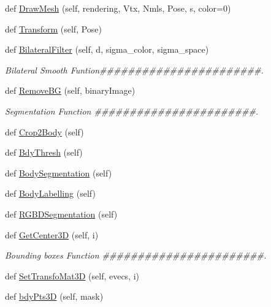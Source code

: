 \begin{DoxyCompactItemize}
\item 
def \hyperlink{class_r_g_b_d_1_1_r_g_b_d_a64b91c854c9de20090ad961f201fe026}{Draw\+Mesh} (self, rendering, Vtx, Nmls, Pose, s, color=0)
\item 
def \hyperlink{class_r_g_b_d_1_1_r_g_b_d_a0ca12b764dab40af78e8a83a5b9f3011}{Transform} (self, Pose)
\item 
def \hyperlink{class_r_g_b_d_1_1_r_g_b_d_a8009d6498ed9607e5fb86d8085244d4f}{Bilateral\+Filter} (self, d, sigma\+\_\+color, sigma\+\_\+space)
\begin{DoxyCompactList}\small\item\em Bilateral Smooth Funtion\#\#\#\#\#\#\#\#\#\#\#\#\#\#\#\#\#\#\#\#\#\#\#. \end{DoxyCompactList}\item 
def \hyperlink{class_r_g_b_d_1_1_r_g_b_d_ad9260800129b014cc2b56acfe0f1bd0e}{Remove\+BG} (self, binary\+Image)
\begin{DoxyCompactList}\small\item\em Segmentation Function \#\#\#\#\#\#\#\#\#\#\#\#\#\#\#\#\#\#\#\#\#\#\#. \end{DoxyCompactList}\item 
def \hyperlink{class_r_g_b_d_1_1_r_g_b_d_a9581af6ebd3185db5b84b0851c7b431e}{Crop2\+Body} (self)
\item 
def \hyperlink{class_r_g_b_d_1_1_r_g_b_d_ad9c546e3a447805ff908cbc072efe6e5}{Bdy\+Thresh} (self)
\item 
def \hyperlink{class_r_g_b_d_1_1_r_g_b_d_aeed6372b3733ba2f4291f2cf187c7455}{Body\+Segmentation} (self)
\item 
def \hyperlink{class_r_g_b_d_1_1_r_g_b_d_a752dd9b82235dce29c270462a8c38556}{Body\+Labelling} (self)
\item 
def \hyperlink{class_r_g_b_d_1_1_r_g_b_d_a543187dff5889d3aab9f613d1bc95c8f}{R\+G\+B\+D\+Segmentation} (self)
\item 
def \hyperlink{class_r_g_b_d_1_1_r_g_b_d_ac25c17b6a7e89feffc914d4b12f0b22e}{Get\+Center3D} (self, i)
\begin{DoxyCompactList}\small\item\em Bounding boxes Function \#\#\#\#\#\#\#\#\#\#\#\#\#\#\#\#\#\#\#\#\#\#\#. \end{DoxyCompactList}\item 
def \hyperlink{class_r_g_b_d_1_1_r_g_b_d_aeac30c5f185a4e6637a63c882bd06d9e}{Set\+Transfo\+Mat3D} (self, evecs, i)
\item 
def \hyperlink{class_r_g_b_d_1_1_r_g_b_d_aa1f7a6e1fa3435e33b779f2b3cd983fd}{bdy\+Pts3D} (self, mask)

\end{DoxyCompactItemize}
